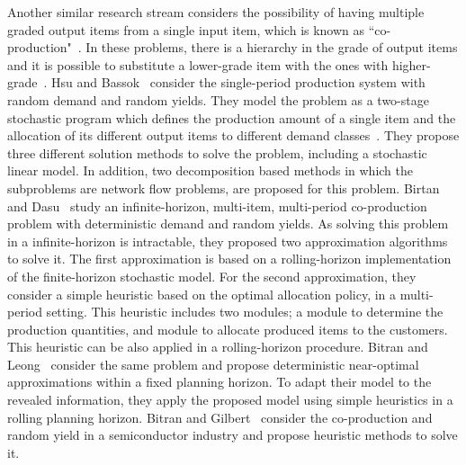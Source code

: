 \documentclass[11pt]{article}
\begin{document}
Another similar research stream considers the possibility of having multiple graded output items from a single input item, which is known as ``co-production"~\cite{ng2012robust}. In these problems, there is a hierarchy in the grade of output items and it is possible to substitute a lower-grade item with the ones with higher-grade~\cite{bitran1992ordering}. Hsu and Bassok~\cite{hsu1999random} consider the single-period production system with random demand  and random yields. 
They model the problem as a two-stage stochastic program which defines the production amount of a single item and the allocation of its different output items to different demand classes~\cite{hsu1999random}. They propose three different solution methods to solve the problem, including a stochastic linear model. In addition, two decomposition based methods in which the subproblems are network flow problems, are proposed for this problem. 
Birtan and Dasu~\cite{bitran1992ordering} study an infinite-horizon, multi-item, multi-period co-production problem with deterministic demand and random yields. As solving this problem in a infinite-horizon is intractable, they proposed two approximation algorithms to solve it. The first approximation is based on a rolling-horizon implementation of the finite-horizon stochastic model. For the second approximation, they consider a simple heuristic based on the optimal allocation policy, in a multi-period setting. This heuristic includes two modules; a module to determine the production quantities, and module to allocate produced items to the customers. This heuristic can be also applied in a rolling-horizon procedure. Bitran and Leong~\cite{bitran1992deterministic} consider the same problem and propose deterministic near-optimal approximations within a fixed planning horizon. To adapt their model to the revealed information, they apply the proposed model using simple heuristics in a rolling planning horizon.  Bitran and Gilbert~\cite{bitran1994co} consider the co-production and random yield in a semiconductor industry and propose heuristic methods to solve it. 
 
\end{document}
